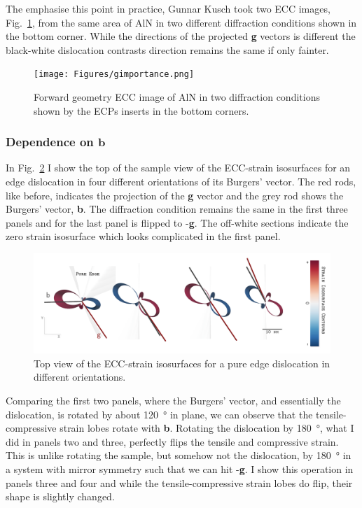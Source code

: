 The emphasise this point in practice, Gunnar Kusch took two ECC images, Fig.~\ref{fig:gimportance},  from the same area of AlN in two different diffraction conditions shown in the bottom corner.   While the directions of the projected \textbf{g} vectors is different the black-white dislocation contrasts direction remains the same if only fainter. 

\begin{figure}[ht]
    \centering
    \texttt{[image: Figures/gimportance.png]}
    \caption{Forward geometry ECC image of AlN in two diffraction conditions shown by the ECPs inserts in the bottom corners.}
    \label{fig:gimportance}
\end{figure}
\subsubsection{Dependence on \texorpdfstring{$\mathbf{b}$}{b}}

In Fig.~\ref{fig:bdependence} I show the top of the sample view of the ECC-strain isosurfaces for an edge dislocation in four different orientations of its Burgers' vector.  The red rods, like before, indicates the projection of the \textbf{g} vector and the grey rod shows the Burgers' vector, \textbf{b}. The diffraction condition remains the same in the first three panels and for the last panel is flipped to -\textbf{g}. The off-white sections indicate the zero strain isosurface which looks complicated in the first panel.


\begin{figure}[ht]
    \centering
    \includegraphics[width=1.05\linewidth]{Figures/bdependence.png}
    \caption{Top view of the ECC-strain isosurfaces for a pure edge dislocation in different orientations.  }
    \label{fig:bdependence}
\end{figure}

Comparing the first two panels, where the Burgers' vector, and essentially the dislocation, is rotated by about \SI{120}{\degree} in plane, we can observe that the tensile-compressive strain lobes rotate with \textbf{b}. Rotating the dislocation by \SI{180}{\degree}, what I did in panels two and three, perfectly flips the tensile and compressive strain. This is unlike rotating the sample, but somehow not the dislocation, by \SI{180}{\degree} in a system with mirror symmetry such that we can hit -\textbf{g}. I show this operation in panels three and four and while the  tensile-compressive strain lobes do flip, their shape is slightly changed. 

